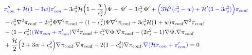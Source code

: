 \documentclass[a4paper,11pt]{article}
\begin{document}
 \begin{align} 
 &{\color{blue}\pi''_{con} +\mathcal{H}(1- 3w) \pi'_{con} } -3 { c_s^2 \mathcal{H}}\Big( 1- \frac{w}{c_s^2} \Big )\Psi - \, {\Psi'}- 3 c_s^2  \,{\Phi'} + {\color{blue}
 \Big( 3\mathcal{H}^2 (c_s^2 -w) + \mathcal{H}' (1-3c_s^2)\Big) \pi_{\text{conf}} }
           \nonumber
   \\
    &
 - c_s^2 {\nabla^2 \pi_{\text{conf}} }
     -2 c_s^2  \Phi  {\nabla^2 \pi_{\text{conf}} }  
  +   (1-c_s^2)  \Psi {\nabla^2 \pi_{\text{conf}} }
  +3 c_s^2 \mathcal{H} (1+w)\pi_{\text{conf}} {\nabla^2 \pi_{\text{conf}} }
                                      \nonumber
   \\
    &
        -   (1-c_s^2)  { \color{blue}(\mathcal{H} \pi_{con}+ \pi'_{con}) } \nabla^2 {\pi_{\text{conf}} }
             +c_s^2 {\nabla  \Phi . \nabla \pi_{\text{conf}} }
        -(2 c_s^2-1) {\nabla  \Psi . \nabla \pi_{\text{conf}} }  
                                    \nonumber
   \\
    &
 +\frac{\mathcal{H}} {2 } \Big(2+3w+c_s^2  \Big){\nabla  \pi_{\text{conf}} . \nabla \pi_{\text{conf}} } 
     -2   (1-c_s^2){\nabla  \pi_{\text{conf}} . {\color{blue}  \nabla {  (\mathcal{H} \pi_{con}+ \pi'_{con})   }}}     =0
  \end{align} 
\end{document}
